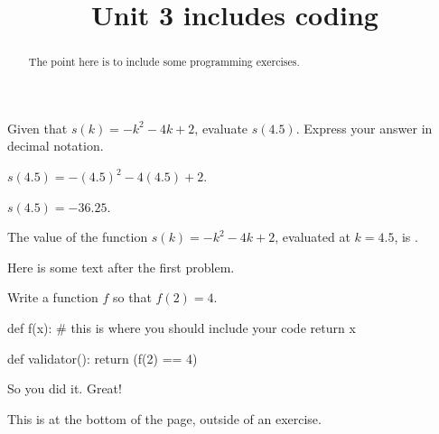 \documentclass{ximera}
\title{Unit 3 includes coding}
\begin{document}
\begin{abstract}
  The point here is to include some programming exercises.
\end{abstract}

\begin{exercise}
Given that $s(k)=-k^2-4 k+2$, evaluate $s(4.5)$. Express your answer in decimal notation.
\begin{solution}
\begin{hint}
$s(4.5)=-(4.5)^2-4 (4.5)+2$.
\end{hint}
\begin{hint}
$s(4.5)=-36.25$.
\end{hint}
The value of the function $s(k)=-k^2-4 k+2$, evaluated at $k=4.5$, is .
\end{solution}

Here is some text after the first problem.
\end{exercise}

\begin{exercise}
Write a function $f$ so that $f(2) = 4$.

\begin{solution}
\begin{python}
def f(x):
  # this is where you should include your code
  return x

def validator():
  return (f(2) == 4)
\end{python}
\end{solution}

So you did it.  Great!
\end{exercise}

This is at the bottom of the page, outside of an exercise.
\end{document}

